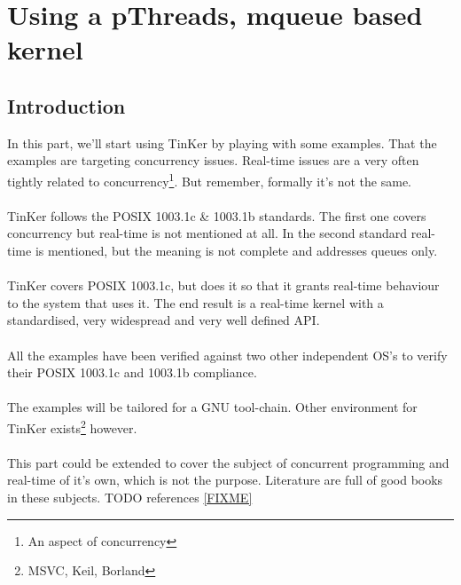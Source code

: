 
\part{Using a pThreads, mqueue based kernel}
\chapter{Introduction}
In this part, we'll start using TinKer by playing with some examples. That the examples are targeting concurrency issues. Real-time issues are a very often tightly related to concurrency\footnote{An aspect of concurrency}. But remember, formally it's not the same.
\\\\
TinKer follows the POSIX 1003.1c \& 1003.1b standards. The first one covers concurrency but real-time is not mentioned at all. In the second standard real-time is mentioned, but the meaning is not complete and addresses queues only.
\\\\
TinKer covers POSIX 1003.1c, but does it so that it grants real-time behaviour to the system that uses it. The end result is a real-time kernel with a standardised, very widespread and very well defined API.
\\\\
All the examples have been verified against two other independent OS's to verify their POSIX 1003.1c and 1003.1b compliance. 
\\\\
The examples will be tailored for a GNU tool-chain. Other environment for TinKer exists\footnote{MSVC, Keil, Borland} however.
\\\\
This part could be extended to cover the subject of concurrent programming and real-time of it's own, which is not the purpose. Literature are full of good books in these subjects. TODO references \ref{FIXME}

